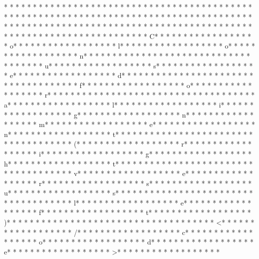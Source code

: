 * * *  * * *  * * *  *  * * *  *  * * *  * * *  * * *  *  * * *  *  * * *  * * *  * * *  *  * * *  *  * * *  *  * * *  * * *  * * *  *  * * *  *  * * *  *  * * *  * * *  * * *  *  * * *  *  * * *  *  * * *  * * *  * * *  *  * * *  *  * * *  *  * * *  * * *  * * *  *  * * *  *  * * *  *  * * *  * * *  * * *  *  * * *  *  * * *  *  * * *  * * *  * * *  *  * * *  *  * * *  * C* * *  * * *  * * *  *  * * *  *  * * *  * o* * *  * * *  * * *  *  * * *  *  * * *  * l* * *  * * *  * * *  *  * * *  *  * * *  * o* * *  * * *  * * *  *  * * *  *  * * *  * n* * *  * * *  * * *  *  * * *  *  * * *  *  * * *  * * *  * * *  *  * * *  *  * * *  * u* * *  * * *  * * *  *  * * *  *  * * *  * s* * *  * * *  * * *  *  * * *  *  * * *  * e* * *  * * *  * * *  *  * * *  *  * * *  * d* * *  * * *  * * *  *  * * *  *  * * *  *  * * *  * * *  * * *  *  * * *  *  * * *  * f* * *  * * *  * * *  *  * * *  *  * * *  * o* * *  * * *  * * *  *  * * *  *  * * *  * r* * *  * * *  * * *  *  * * *  *  * * *  *  * * *  * * *  * * *  *  * * *  *  * * *  * a* * *  * * *  * * *  *  * * *  *  * * *  * l* * *  * * *  * * *  *  * * *  *  * * *  * i* * *  * * *  * * *  *  * * *  *  * * *  * g* * *  * * *  * * *  *  * * *  *  * * *  * n* * *  * * *  * * *  *  * * *  *  * * *  * m* * *  * * *  * * *  *  * * *  *  * * *  * e* * *  * * *  * * *  *  * * *  *  * * *  * n* * *  * * *  * * *  *  * * *  *  * * *  * t* * *  * * *  * * *  *  * * *  *  * * *  *  * * *  * * *  * * *  *  * * *  *  * * *  * (* * *  * * *  * * *  *  * * *  *  * * *  * r* * *  * * *  * * *  *  * * *  *  * * *  * i* * *  * * *  * * *  *  * * *  *  * * *  * g* * *  * * *  * * *  *  * * *  *  * * *  * h* * *  * * *  * * *  *  * * *  *  * * *  * t* * *  * * *  * * *  *  * * *  *  * * *  *  * * *  * * *  * * *  *  * * *  *  * * *  * v* * *  * * *  * * *  *  * * *  *  * * *  * e* * *  * * *  * * *  *  * * *  *  * * *  * r* * *  * * *  * * *  *  * * *  *  * * *  * s* * *  * * *  * * *  *  * * *  *  * * *  * u* * *  * * *  * * *  *  * * *  *  * * *  * s* * *  * * *  * * *  *  * * *  *  * * *  *  * * *  * * *  * * *  *  * * *  *  * * *  * l* * *  * * *  * * *  *  * * *  *  * * *  * e* * *  * * *  * * *  *  * * *  *  * * *  * f* * *  * * *  * * *  *  * * *  *  * * *  * t* * *  * * *  * * *  *  * * *  *  * * *  * )* * *  * * *  * * *  *  * * *  *  * * *  * 
* * *  * * *  * * *  *  * * *  *  * * *  * <* * *  * * *  * * *  *  * * *  *  * * *  * /* * *  * * *  * * *  *  * * *  *  * * *  * c* * *  * * *  * * *  *  * * *  *  * * *  * o* * *  * * *  * * *  *  * * *  *  * * *  * d* * *  * * *  * * *  *  * * *  *  * * *  * e* * *  * * *  * * *  *  * * *  *  * * *  * >* * *  * * *  * * *  *  * * *  *  * * *  * 
